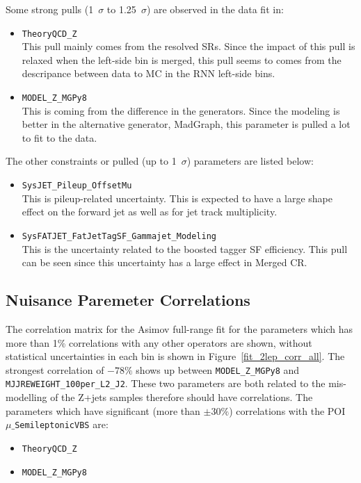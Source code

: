 Some strong pulls (1~$\sigma$ to 1.25~$\sigma$) are observed in the data fit in:
\begin{itemize}
    \item \texttt{TheoryQCD\_Z}\\
    This pull mainly comes from the resolved SRs. Since the impact of this pull is relaxed when the left-side bin is merged, this pull seems to comes from the descripance between data to MC in the RNN left-side bins.
    \item \texttt{MODEL\_Z\_MGPy8}\\
    This is coming from the difference in the generators. Since the modeling is better in the alternative generator, MadGraph, this parameter is pulled a lot to fit to the data.
\end{itemize}
The other constraints or pulled (up to 1~$\sigma$) parameters are listed below:
\begin{itemize}
    \item \texttt{SysJET\_Pileup\_OffsetMu}\\
    This is pileup-related uncertainty. This is expected to have a large shape effect on the forward jet as well as for jet track multiplicity.
    \item \texttt{SysFATJET\_FatJetTagSF\_Gammajet\_Modeling} \\
    This is the uncertainty related to the boosted tagger SF efficiency. This pull can be seen since this  uncertainty has a large effect in Merged CR.
\end{itemize}

\subsection{Nuisance Paremeter Correlations}
The correlation matrix for the Asimov full-range fit for the parameters which has more than 1\% correlations with any other operators are shown, without statistical uncertainties in each bin is shown in Figure~\ref{fit_2lep_corr_all}. The strongest correlation of $\minus 78\%$ shows up between \texttt{MODEL\_Z\_MGPy8} and \texttt{MJJREWEIGHT\_100per\_L2\_J2}. These two parameters are both related to the mis-modelling of the Z+jets samples therefore should have correlations.
The parameters which have significant (more than $\pm 30\%$) correlations with the POI \texttt{$\mu\_$SemileptonicVBS} are:
\begin{itemize}
    \item \texttt{TheoryQCD\_Z} 
    \item \texttt{MODEL\_Z\_MGPy8} \\
\end{itemize}

